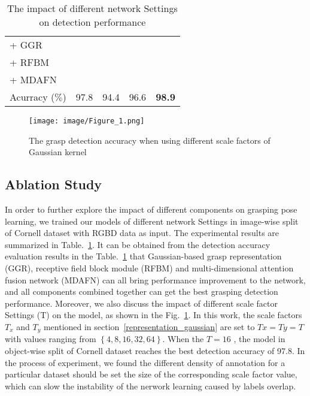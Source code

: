 \documentclass[journal]{IEEEtran}
\begin{document}
\begin{table}[t!]
	\caption{The impact of different network Settings on detection performance}
	\begin{center}
		\begin{tabular}{p{60pt}|p{20pt}|p{20pt}|p{20pt}|p{20pt}}
			\hline
			+ GGR&& \checkmark &\checkmark& \checkmark\\
			+ RFBM&\checkmark &  &\checkmark& \checkmark\\
			+ MDAFN&\checkmark&\checkmark &&\checkmark \\
			\hline
			Acurracy ($\%$)& 97.8 & 94.4 &96.6&\textbf{98.9} \\
			\hline
		\end{tabular}
	\end{center}
	\label{tab:settings}
\end{table}


\begin{figure}[t!]
	\centering  
	\texttt{[image: image/Figure\_1.png]}
	\caption{The grasp detection accuracy when using different scale factors of Gaussian kernel}
	\label{fig:factor}
\end{figure}

\subsection{Ablation Study}
\label{ablation_study}
In order to further explore the impact of different components on grasping pose learning, we trained our models of different network Settings in image-wise split of Cornell dataset with RGBD data as input. The experimental results are summarized in Table.~\ref{tab:settings}. It can be obtained from the detection accuracy evaluation results in the Table.~\ref{tab:settings} that Gaussian-based grasp representation (GGR), receptive field block module (RFBM) and multi-dimensional attention fusion network (MDAFN) can all bring performance improvement to the network, and all components combined together can get the best grasping detection performance. Moreover, we also discuss the impact of different scale factor Settings (T) on the model, as shown in the Fig.~\ref{fig:factor}. In this work, the scale factors $T_x$ and $T_y$ mentioned in section~\ref{representation_gaussian} are set to $Tx=Ty=T$ with values ranging from $\left\{4,8,16,32,64\right\}$. When the $T = 16$ , the model in object-wise split of Cornell dataset reaches the best detection accuracy of 97.8. In the process of experiment, we found the different density of annotation for a particular dataset should be set the size of the corresponding scale factor value, which can slow the instability of the nerwork learning caused by labels overlap.
\end{document}
